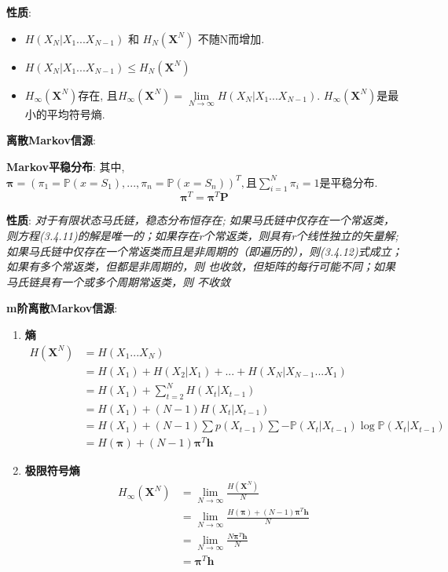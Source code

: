 \documentclass{article}
\newcommand{\env}[2]{\begin{#1}#2\end{#1}}
\begin{document}
                \textbf{性质}: 
                    \env{itemize}{
                    \item $H(X_N | X_1 ... X_{N-1})$ 和 $H_N(\boldsymbol X^N)$ 不随N而增加.
                    \item $H(X_N | X_1 ... X_{N-1}) \le H_N(\boldsymbol X^N)$
                    \item $H_\infty(\boldsymbol X^N)$存在, 且$H_\infty(\boldsymbol X^N) = \lim\limits_{N \to \infty} H(X_N | X_1 ... X_{N-1})$. $H_\infty(\boldsymbol X^N)$是最小的平均符号熵.
                    }
                

        \textbf{离散Markov信源}:
        
            \textbf{Markov平稳分布}: 其中, $\boldsymbol \pi = (\pi_1 = \mathbb P(x = S_1), ..., \pi_n = \mathbb P(x = S_n))^T, \text{且} \sum\limits_{i=1}^N \pi_i = 1$是平稳分布.
                $$\boldsymbol \pi^T = \boldsymbol \pi^T \boldsymbol P$$
                
                \textbf{性质}: \textit{对于有限状态马氏链，稳态分布恒存在; 如果马氏链中仅存在一个常返类，则方程(3.4.11)的解是唯一的；如果存在r个常返类，则具有r个线性独立的矢量解; 如果马氏链中仅存在一个常返类而且是非周期的（即遍历的），则(3.4.12)式成立；如果有多个常返类，但都是非周期的，则       也收敛，但矩阵的每行可能不同；如果马氏链具有一个或多个周期常返类，则      不收敛}

        \textbf{m阶离散Markov信源}:
            \env{enumerate}{
            \item \textbf{熵}
                \env{align*}{
                    H(\boldsymbol X^N) &= H(X_1 ... X_N)\\
                    &= H(X_1) + H(X_2|X_1) + ... + H(X_N | X_{N-1} ... X_{1}) \tag{条件熵展开}\\
                    &= H(X_1) + \sum\limits_{t=2}^N H(X_t | X_{t-1}) \tag{Markov性}\\
                    &= H(X_1) + (N-1) H(X_t | X_{t-1}) \tag{平稳性}\\
                    &= H(X_1) + (N-1) \sum p(X_{t-1}) \sum - \mathbb P(X_t | X_{t-1}) \log \mathbb P(X_t | X_{t-1}) \tag{条件熵代入}\\
                    &= H(\boldsymbol \pi) + (N-1)  \boldsymbol \pi^T \boldsymbol h \tag{平稳分布$\boldsymbol \pi$代入}
                }
            \item \textbf{极限符号熵}
                \env{align*}{
                    H_\infty(\boldsymbol X^N) &= \lim\limits_{N \to \infty}\frac{H(\boldsymbol X^N)}{N} \tag{定义}\\
                    &= \lim\limits_{N \to \infty} \frac{H(\boldsymbol \pi) + (N-1)  \boldsymbol \pi^T \boldsymbol h}{N} \tag{代入}\\
                    &= \lim\limits_{N \to \infty} \frac{N \boldsymbol \pi^T \boldsymbol h}{N} \tag{省略$\to 0$量}\\
                    &= \boldsymbol \pi^T \boldsymbol h
                }
            }
\end{document}
